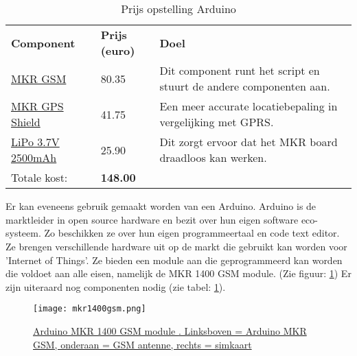 \section{}
\begin{table}[]
	\begin{tabular}{llp{10cm}}
		\textbf{Component}         & \textbf{Prijs (euro)} & \textbf{Doel}\\
		\href{https://store.arduino.cc/arduino-mkr-gsm-1400-1415}{MKR GSM}           & 80.35        & Dit component runt het script en stuurt de andere componenten aan.\\
		\href{https://store.arduino.cc/arduino-mkr-gps-shield}{MKR GPS Shield}    & 41.75        & Een meer accurate locatiebepaling in vergelijking met GPRS.\\
		\href{https://www.kiwi-electronics.nl/lithium-ion-polymer-battery-3-7v-2500mAh}{LiPo 3.7V 2500mAh} & 25.90        & Dit zorgt ervoor dat het MKR board draadloos kan werken.\\
		Totale kost:      & \textbf{148.00}       &                                                                         
	\end{tabular}
	\caption{Prijs opstelling Arduino}
	\label{tab:arduino}
\end{table}
Er kan eveneens gebruik gemaakt worden van een Arduino. Arduino is de marktleider in open source hardware en bezit over hun eigen software eco-systeem. Zo beschikken ze over hun eigen programmeertaal en code text editor. Ze brengen verschillende hardware uit op de markt die gebruikt kan worden voor 'Internet of Things'. Ze bieden een module aan die geprogrammeerd kan worden die voldoet aan alle eisen, namelijk de MKR 1400 GSM module. (Zie figuur: \ref{fig:mkr1400}) Er zijn uiteraard nog componenten nodig (zie tabel: \ref{tab:arduino}).
\begin{figure}
    \texttt{[image: mkr1400gsm.png]}
    \caption[Arduino MKR 1400 GSM module]{\href{https://store.arduino.cc/arduino-sim-mkr-gsm-1400-cellular-kit-1417?fbclid=IwAR0kJk6t6PVON-YakV_EiSOnb5y2RgBRQW0c6pVmpRw-hJlPRHO99qDdjSA}{Arduino MKR 1400 GSM module \autocite{fig_MKR1400}. Linksboven = Arduino MKR GSM, onderaan = GSM antenne, rechts = simkaart}}
    \label{fig:mkr1400}
\end{figure}